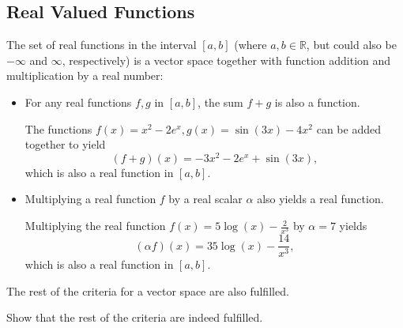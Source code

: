 \subsection{Real Valued Functions}
The set of real functions in the interval $\left[ a,b \right]$ (where $a,b\in\mathbb{R}$, but could also be $-\infty$ and $\infty$, respectively) is a vector space together with function addition and multiplication by a real number:
\begin{itemize}
  \item For any real functions $f, g$ in $\left[ a,b \right]$, the sum $f+g$ is also a function.
        \begin{example}
          The functions $f(x)=x^{2}-2e^{x}, g(x)=\sin(3x)-4x^{2}$ can be added together to yield
          \begin{equation*}
            \left( f+g \right)(x) = -3x^{2}-2e^{x}+\sin(3x),
          \end{equation*}
          which is also a real function in $\left[ a,b \right]$.
        \end{example}
  \item Multiplying a real function $f$ by a real scalar $\alpha$ also yields a real function.
        \begin{example}
          Multiplying the real function $f(x)=5\log(x)-\frac{2}{x^{3}}$ by $\alpha=7$ yields
          \begin{equation*}
            \left( \alpha f \right)(x) = 35\log(x)-\frac{14}{x^{3}},
          \end{equation*}
          which is also a real function in $\left[ a,b \right]$.
        \end{example}
\end{itemize}

The rest of the criteria for a vector space are also fulfilled.
\begin{challange}
  Show that the rest of the criteria are indeed fulfilled.
\end{challange}

